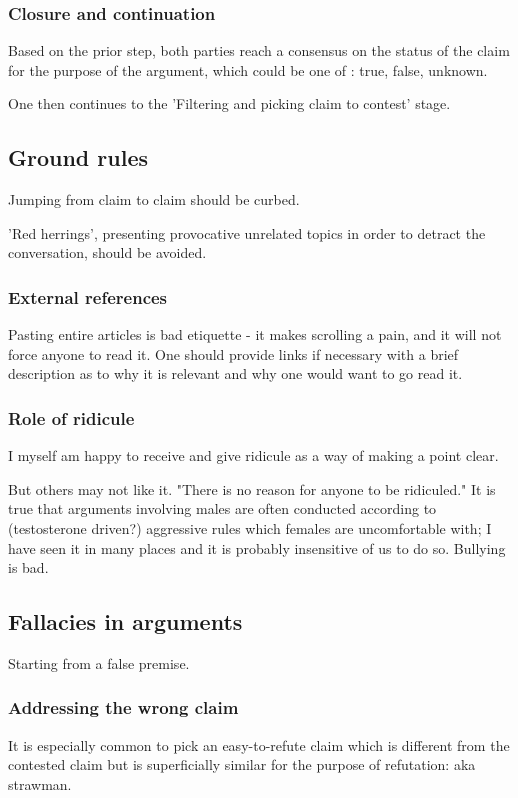\documentclass[oneside, article]{memoir}
\begin{document}
\subsubsection{Closure and continuation}
Based on the prior step, both parties reach a consensus on the status of the claim for the purpose of the argument, which could be one of : true, false, unknown.

One then continues to the 'Filtering and picking claim to contest' stage.

\subsection{Ground rules}
Jumping from claim to claim should be curbed.

'Red herrings', presenting provocative unrelated topics in order to detract the conversation, should be avoided.

\subsubsection{External references}
Pasting entire articles is bad etiquette - it makes scrolling a pain, and it will not force anyone to read it. One should provide links if necessary with a brief description as to why it is relevant and why one would want to go read it.

\subsubsection{Role of ridicule}
I myself am happy to receive and give ridicule as a way of making a point clear.

But others may not like it. "There is no reason for anyone to be ridiculed." It is true that arguments involving males are often conducted according to (testosterone driven?) aggressive rules which females are uncomfortable with; I have seen it in many places and it is probably insensitive of us to do so. Bullying is bad.

\subsection{Fallacies in arguments}
Starting from a false premise.

\subsubsection{Addressing the wrong claim}
It is especially common to pick an easy-to-refute claim which is different from the contested claim but is superficially similar for the purpose of refutation: aka strawman.
\end{document}
